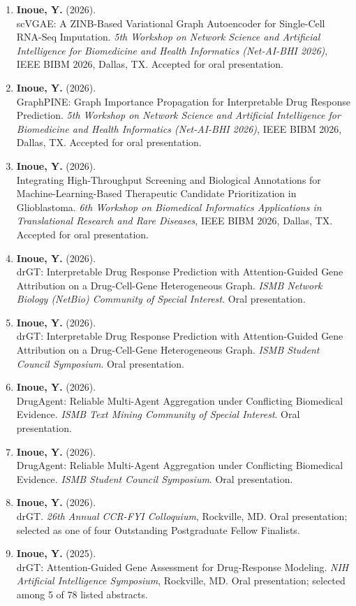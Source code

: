 \documentclass[11pt]{article}
\newcommand{\publication}[3]{%
  \entryspace\item #1\\
  #2. #3
}
\begin{document}

\begin{enumerate}[label={O\arabic*.}]

  \publication
  {\textbf{Inoue, Y.} (2026).}
  {scVGAE: A ZINB-Based Variational Graph Autoencoder for Single-Cell RNA-Seq Imputation}
  {\textit{5th Workshop on Network Science and Artificial Intelligence for Biomedicine and Health Informatics (Net-AI-BHI 2026)}, IEEE BIBM 2026, Dallas, TX. Accepted for oral presentation.}
  \publication
  {\textbf{Inoue, Y.} (2026).}
  {GraphPINE: Graph Importance Propagation for Interpretable Drug Response Prediction}
  {\textit{5th Workshop on Network Science and Artificial Intelligence for Biomedicine and Health Informatics (Net-AI-BHI 2026)}, IEEE BIBM 2026, Dallas, TX. Accepted for oral presentation.}

  \publication
  {\textbf{Inoue, Y.} (2026).}
  {Integrating High-Throughput Screening and Biological Annotations for Machine-Learning-Based Therapeutic Candidate Prioritization in Glioblastoma}
  {\textit{6th Workshop on Biomedical Informatics Applications in Translational Research and Rare Diseases}, IEEE BIBM 2026, Dallas, TX. Accepted for oral presentation.}

  \publication
  {\textbf{Inoue, Y.} (2026).}
  {drGT: Interpretable Drug Response Prediction with Attention-Guided Gene Attribution on a Drug-Cell-Gene Heterogeneous Graph}
  {\textit{ISMB Network Biology (NetBio) Community of Special Interest}. Oral presentation.}

  \publication
  {\textbf{Inoue, Y.} (2026).}
  {drGT: Interpretable Drug Response Prediction with Attention-Guided Gene Attribution on a Drug-Cell-Gene Heterogeneous Graph}
  {\textit{ISMB Student Council Symposium}. Oral presentation.}

  \publication
  {\textbf{Inoue, Y.} (2026).}
  {DrugAgent: Reliable Multi-Agent Aggregation under Conflicting Biomedical Evidence}
  {\textit{ISMB Text Mining Community of Special Interest}. Oral presentation.}

  \publication
  {\textbf{Inoue, Y.} (2026).}
  {DrugAgent: Reliable Multi-Agent Aggregation under Conflicting Biomedical Evidence}
  {\textit{ISMB Student Council Symposium}. Oral presentation.}

  \publication
  {\textbf{Inoue, Y.} (2026).}
  {drGT}
  {\textit{26th Annual CCR-FYI Colloquium}, Rockville, MD. Oral presentation; selected as one of four Outstanding Postgraduate Fellow Finalists.}

  \publication
  {\textbf{Inoue, Y.} (2025).}
  {drGT: Attention-Guided Gene Assessment for Drug-Response Modeling}
  {\textit{NIH Artificial Intelligence Symposium}, Rockville, MD. Oral presentation; selected among 5 of 78 listed abstracts.}

\end{enumerate}
\end{document}
